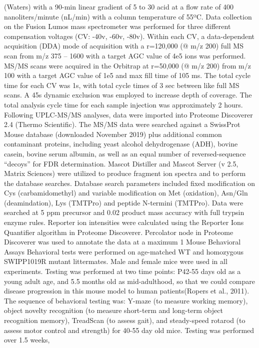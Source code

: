 (Waters) with a 90-min linear gradient of 5 to 30%
acid at a flow rate of 400 nanoliters/minute (nL/min) with a column temperature
of 55ºC. Data collection on the Fusion Lumos mass spectrometer was performed for
three different compensation voltages (CV: -40v, -60v, -80v). Within each CV, a
data-dependent acquisition (DDA) mode of acquisition with a r=120,000 (@ m/z
200) full MS scan from m/z 375 – 1600 with a target AGC value of 4e5 ions was
performed. MS/MS scans were acquired in the Orbitrap at r=50,000 (@ m/z 200)
from m/z 100 with a target AGC value of 1e5 and max fill time of 105 ms. The
total cycle time for each CV was 1s, with total cycle times of 3 sec between
like full MS scans. A 45s dynamic exclusion was employed to increase depth of
coverage. The total analysis cycle time for each sample injection was
approximately 2 hours.
Following UPLC-MS/MS analyses, data were imported into Proteome Discoverer 2.4
(Thermo Scientific). The MS/MS data were searched against a SwissProt Mouse
database (downloaded November 2019) plus additional common contaminant proteins,
including yeast alcohol dehydrogenase (ADH), bovine casein, bovine serum
albumin, as well as an equal number of reversed-sequence “decoys” for FDR
determination. Mascot Distiller and Mascot Server (v 2.5, Matrix Sciences) were
utilized to produce fragment ion spectra and to perform the database searches.
Database search parameters included fixed modification on Cys (carbamidomethyl)
and variable modification on Met (oxidation), Asn/Gln (deamindation), Lys
(TMTPro) and peptide N-termini (TMTPro). Data were searched at 5 ppm precursor
and 0.02 product mass accuracy with full trypsin enzyme rules. Reporter ion
intensities were calculated using the Reporter Ions Quantifier algorithm in
Proteome Discoverer. Percolator node in Proteome Discoverer was used to annotate
the data at a maximum 1%
Mouse Behavioral Assays
Behavioral tests were performed on age-matched WT and homozygous SWIPP1019R
mutant littermates. Male and female mice were used in all experiments. Testing
was performed at two time points: P42-55 days old as a young adult age, and 5.5
months old as mid-adulthood, so that we could compare disease progression in
this mouse model to human patients(Ropers et al., 2011). The sequence of
behavioral testing was: Y-maze (to measure working memory), object novelty
recognition (to measure short-term and long-term object recognition memory),
TreadScan (to assess gait), and steady-speed rotarod (to assess motor control
and strength) for 40-55 day old mice. Testing was performed over 1.5 weeks,
